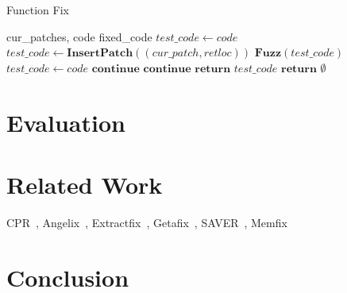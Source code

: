 \documentclass[a4j,dvipdfmx]{article}
\begin{document}
 \begin{algorithm}
 \caption{Function Fix}
 \label{fix}
 \begin{algorithmic}[1]
 \renewcommand{\algorithmicrequire}{\textbf{Input:}}
 \renewcommand{\algorithmicensure}{\textbf{Output:}}
 \REQUIRE cur\_patches, code
 \ENSURE  fixed\_code
  \STATE $test\_code \gets code$
    \STATE $test\_code \gets \textbf{InsertPatch}((cur\_patch,retloc))$
    \STATE $\textbf{Fuzz}(test\_code)$
     \STATE $test\_code \gets code$
     \STATE $\textbf{continue}$
     \STATE $\textbf{continue}$
    \ELSE 
     \STATE $\textbf{return}$ $test\_code$
    \ENDIF
   \ENDFOR
  \ENDFOR
  \STATE $\textbf{return}$ $\emptyset$


 \end{algorithmic} 
 \end{algorithm}



\section{Evaluation}

\section{Related Work}
CPR~\cite{CPR}, Angelix~\cite{Angelix}, Extractfix~\cite{Extractfix}, Getafix~\cite{Getafix}, SAVER~\cite{SAVER}, Memfix~\cite{Memfix}


\section{Conclusion}



\def\newblock{\hskip .11em plus .33em minus .07em}



\end{document}
